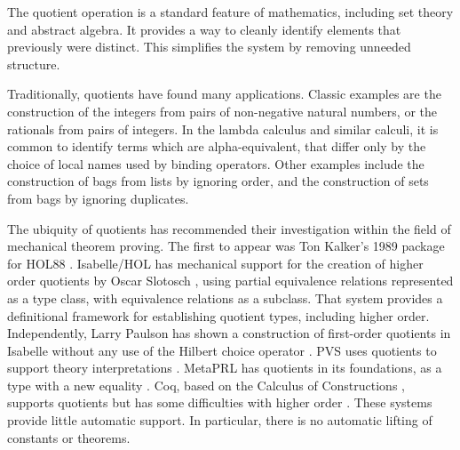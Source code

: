 \documentclass[envcountsame,runningheads]{llncs}
\begin{document}
The quotient operation is a standard feature of mathematics,
including set theory and abstract algebra.  It provides a way to
cleanly identify elements that previously were distinct.
This simplifies the system by removing unneeded structure.

Traditionally, quotients have found many applications.
Classic examples are the construction
of the integers from pairs of non-negative natural numbers,
or
the rationals from pairs of integers.
In the lambda calculus \cite{Bar81} and similar calculi, it is
common to identify terms which are alpha-equivalent, that differ only by
the choice of local names used by binding operators.
Other examples include the construction of bags from lists by ignoring order,
and the construction of sets from bags by ignoring duplicates.

The ubiquity of quotients has recommended their investigation
within the field of mechanical theorem proving.
The first to appear was Ton Kalker's 1989 package for HOL88 \cite{Kal89}.
Isabelle/HOL
\cite{NiPaWe02}
has mechanical support for the creation of
higher order quotients by Oscar Slotosch \cite{Slo97},
using partial equivalence relations represented as a type class,
with equivalence relations as a subclass.
That system provides a definitional framework for establishing
quotient types, including higher order.
Independently, Larry Paulson has shown a construction of first-order quotients
in Isabelle without any use of the Hilbert choice operator
\cite{LP04}.
PVS uses quotients to support theory interpretations \cite{OwS01}.
MetaPRL has quotients in its foundations,
as a type with a new equality \cite{Nog02}.
Coq, based on the Calculus of Constructions \cite{Hof95},
supports quotients \cite{GPWZ02} but
has some difficulties with higher order
\cite{CPS02}.
These systems provide little automatic support.
In particular, there is no automatic lifting of constants or theorems.
\end{document}
